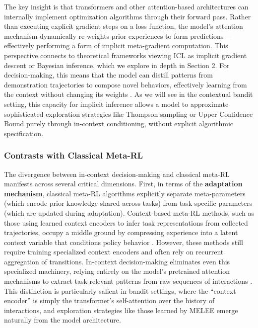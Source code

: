 \documentclass[11pt]{article}
\begin{document}
The key insight is that transformers and other attention-based architectures can internally implement optimization algorithms through their forward pass. Rather than executing explicit gradient steps on a loss function, the model's attention mechanism dynamically re-weights prior experiences to form predictions---effectively performing a form of implicit meta-gradient computation. This perspective connects to theoretical frameworks viewing ICL as implicit gradient descent or Bayesian inference, which we explore in depth in Section 2. For decision-making, this means that the model can distill patterns from demonstration trajectories to compose novel behaviors, effectively learning from the context without changing its weights \cite{ref307}. As we will see in the contextual bandit setting, this capacity for implicit inference allows a model to approximate sophisticated exploration strategies like Thompson sampling or Upper Confidence Bound purely through in-context conditioning, without explicit algorithmic specification.

\subsubsection{Contrasts with Classical Meta-RL}

The divergence between in-context decision-making and classical meta-RL manifests across several critical dimensions. First, in terms of the \textbf{adaptation mechanism}, classical meta-RL algorithms explicitly separate meta-parameters (which encode prior knowledge shared across tasks) from task-specific parameters (which are updated during adaptation). Context-based meta-RL methods, such as those using learned context encoders to infer task representations from collected trajectories, occupy a middle ground by compressing experience into a latent context variable that conditions policy behavior \cite{ref310,ref311}. However, these methods still require training specialized context encoders and often rely on recurrent aggregation of transitions. In-context decision-making eliminates even this specialized machinery, relying entirely on the model's pretrained attention mechanisms to extract task-relevant patterns from raw sequences of interactions \cite{ref312}. This distinction is particularly salient in bandit settings, where the ``context encoder'' is simply the transformer's self-attention over the history of interactions, and exploration strategies like those learned by MELEE \cite{ref313} emerge naturally from the model architecture.
\end{document}
